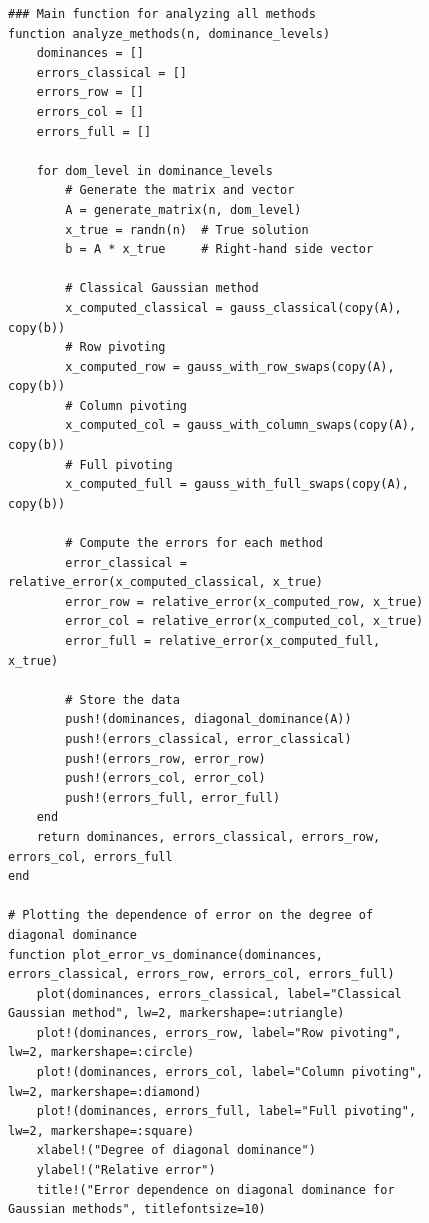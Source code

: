 \documentclass[a4paper, 14pt]{extarticle}
\begin{document}
\begin{figure}[!htb]
\begin{lstlisting}[caption={Реализация и сравнение разных вариаций метода Гаусса},label={lst:code4}]
### Main function for analyzing all methods
function analyze_methods(n, dominance_levels)
    dominances = []
    errors_classical = []
    errors_row = []
    errors_col = []
    errors_full = []

    for dom_level in dominance_levels
        # Generate the matrix and vector
        A = generate_matrix(n, dom_level)
        x_true = randn(n)  # True solution
        b = A * x_true     # Right-hand side vector

        # Classical Gaussian method
        x_computed_classical = gauss_classical(copy(A), copy(b))
        # Row pivoting
        x_computed_row = gauss_with_row_swaps(copy(A), copy(b))
        # Column pivoting
        x_computed_col = gauss_with_column_swaps(copy(A), copy(b))
        # Full pivoting
        x_computed_full = gauss_with_full_swaps(copy(A), copy(b))

        # Compute the errors for each method
        error_classical = relative_error(x_computed_classical, x_true)
        error_row = relative_error(x_computed_row, x_true)
        error_col = relative_error(x_computed_col, x_true)
        error_full = relative_error(x_computed_full, x_true)

        # Store the data
        push!(dominances, diagonal_dominance(A))
        push!(errors_classical, error_classical)
        push!(errors_row, error_row)
        push!(errors_col, error_col)
        push!(errors_full, error_full)
    end
    return dominances, errors_classical, errors_row, errors_col, errors_full
end

# Plotting the dependence of error on the degree of diagonal dominance
function plot_error_vs_dominance(dominances, errors_classical, errors_row, errors_col, errors_full)
    plot(dominances, errors_classical, label="Classical Gaussian method", lw=2, markershape=:utriangle)
    plot!(dominances, errors_row, label="Row pivoting", lw=2, markershape=:circle)
    plot!(dominances, errors_col, label="Column pivoting", lw=2, markershape=:diamond)
    plot!(dominances, errors_full, label="Full pivoting", lw=2, markershape=:square)
    xlabel!("Degree of diagonal dominance")
    ylabel!("Relative error")
    title!("Error dependence on diagonal dominance for Gaussian methods", titlefontsize=10)
\end{lstlisting}
\end{figure}
\end{document}
